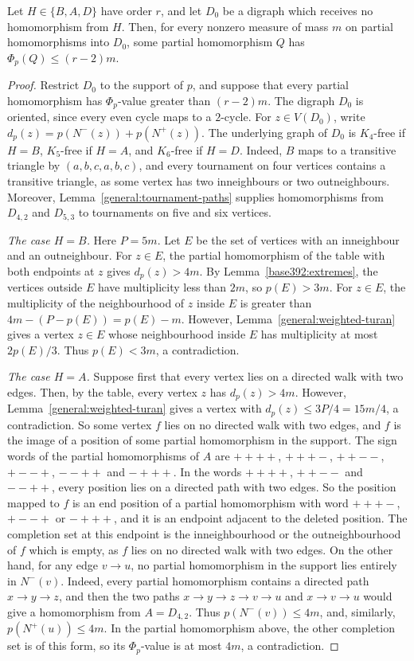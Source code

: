 \begin{lemma}\label{base392:zero}
Let $H\in\{B,A,D\}$ have order $r$, and let $D_0$ be a digraph which receives no homomorphism from
$H$. Then, for every nonzero measure of mass $m$ on partial homomorphisms into $D_0$, some partial homomorphism $Q$ has $\Phi_p(Q)\le(r-2)m$.
\end{lemma}
\begin{proof}
Restrict $D_0$ to the support of $p$, and suppose that every partial homomorphism has $\Phi_p$-value greater than $(r-2)m$. The digraph $D_0$ is oriented, since every even cycle maps to a $2$-cycle. For $z\in V(D_0)$, write $d_p(z)=p(N^-(z))+p(N^+(z))$.
The underlying graph of $D_0$ is $K_4$-free if $H=B$, $K_5$-free if $H=A$, and $K_6$-free if $H=D$. Indeed, $B$ maps to a transitive triangle by $(a,b,c,a,b,c)$, and every tournament on four vertices contains a transitive triangle, as some vertex has two inneighbours or two outneighbours. Moreover, Lemma~\ref{general:tournament-paths}
supplies homomorphisms from $D_{4,2}$ and $D_{5,3}$ to tournaments on five and six vertices.

\emph{The case $H=B$.} Here $P=5m$. Let $E$ be the set of vertices
with an inneighbour and an outneighbour. For $z\in E$, the partial homomorphism of the table with both endpoints at $z$ gives $d_p(z)>4m$.
By Lemma~\ref{base392:extremes}, the vertices outside $E$ have multiplicity less than $2m$, so $p(E)>3m$. For $z\in E$, the multiplicity of the neighbourhood of $z$ inside $E$ is greater than $4m-(P-p(E))=p(E)-m$. However, Lemma~\ref{general:weighted-turan} gives a vertex $z\in E$ whose neighbourhood inside $E$ has multiplicity at most $2p(E)/3$. Thus $p(E)<3m$, a contradiction.

\emph{The case $H=A$.} Suppose first that every vertex lies on a directed walk with two edges. Then, by the table, every vertex $z$ has $d_p(z)>4m$. However, Lemma~\ref{general:weighted-turan} gives a vertex with $d_p(z)\le 3P/4=15m/4$, a contradiction.
So some vertex $f$ lies on no directed walk with two edges, and $f$ is the image of a position of some partial homomorphism in the support. The sign words of the partial homomorphisms of $A$ are $++++$, $+++-$, $++--$, $+--+$, $--++$ and $-+++$. In the words $++++$, $++--$ and $--++$, every position lies on a directed path with two edges. So the position mapped to $f$ is an end position of a partial homomorphism with word $+++-$, $+--+$ or $-+++$, and it is an endpoint adjacent to the deleted position. The completion set at this endpoint is the inneighbourhood or the outneighbourhood of $f$ which is empty, as $f$ lies on no directed walk with two edges.
On the other hand, for any edge $v\to u$, no partial homomorphism in the support lies entirely in $N^-(v)$. Indeed, every partial homomorphism contains a directed path $x\to y\to z$, and then the two paths $x\to y\to z\to v\to u$ and $x\to v\to u$ would give a homomorphism from $A=D_{4,2}$. Thus $p(N^-(v))\le4m$, and, similarly, $p(N^+(u))\le 4m$. In the partial homomorphism above, the other completion set is of this form, so its $\Phi_p$-value is at most $4m$, a contradiction.


\end{proof}
